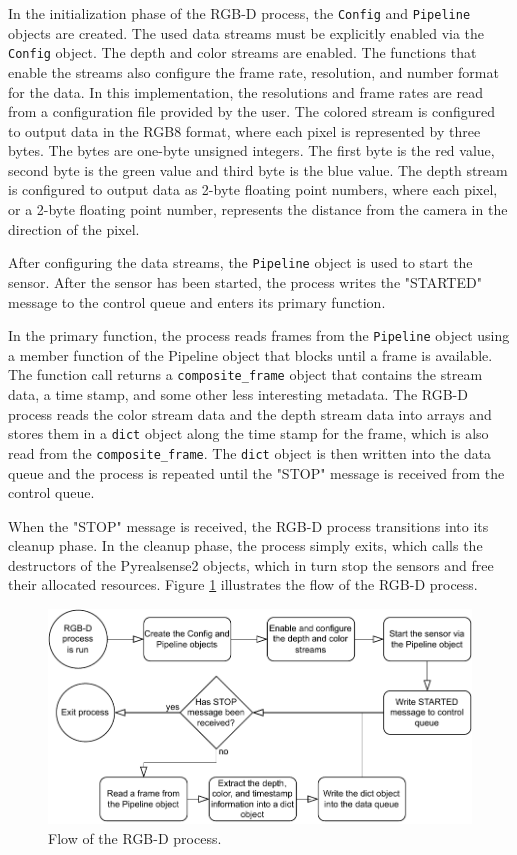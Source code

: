 In the initialization phase of the RGB-D process, the \texttt{Config} and \texttt{Pipeline} objects are created.
The used data streams must be explicitly enabled via the \texttt{Config} object.
The depth and color streams are enabled.
The functions that enable the streams also configure the frame rate, resolution, and number format for the data.
In this implementation, the resolutions and frame rates are read from a configuration file provided by the user.
The colored stream is configured to output data in the RGB8 format, where each pixel is represented by three bytes.
The bytes are one-byte unsigned integers. The first byte is the red value, second byte is the green value and third byte is the blue value.
The depth stream is configured to output data as 2-byte floating point numbers,
where each pixel, or a 2-byte floating point number, represents the distance from the camera in the direction of the pixel.

After configuring the data streams, the \texttt{Pipeline} object is used to start the sensor.
After the sensor has been started, the process writes the "STARTED" message to the control queue and enters its primary function.

In the primary function, the process reads frames from the \texttt{Pipeline} object using a member function of the Pipeline object that blocks until a frame is available.
The function call returns a \texttt{composite\_frame} object that contains the stream data, a time stamp, and some other less interesting metadata.
The RGB-D process reads the color stream data and the depth stream data into arrays and stores them in a \texttt{dict} object along the time stamp for the frame,
which is also read from the \texttt{composite\_frame}.
The \texttt{dict} object is then written into the data queue and the process is repeated until the "STOP" message is received from the control queue.

When the "STOP" message is received,
the RGB-D process transitions into its cleanup phase.
In the cleanup phase, the process simply exits,
which calls the destructors of the Pyrealsense2 objects,
which in turn stop the sensors and free their allocated resources.
Figure \ref{fig:3-rgbd-flowchart} illustrates the flow of the RGB-D process.

\begin{figure}
    \centering
    \includegraphics{fig/3/rgbd-flowchart.pdf}
    \caption{Flow of the RGB-D process.}
    \label{fig:3-rgbd-flowchart}
\end{figure}

